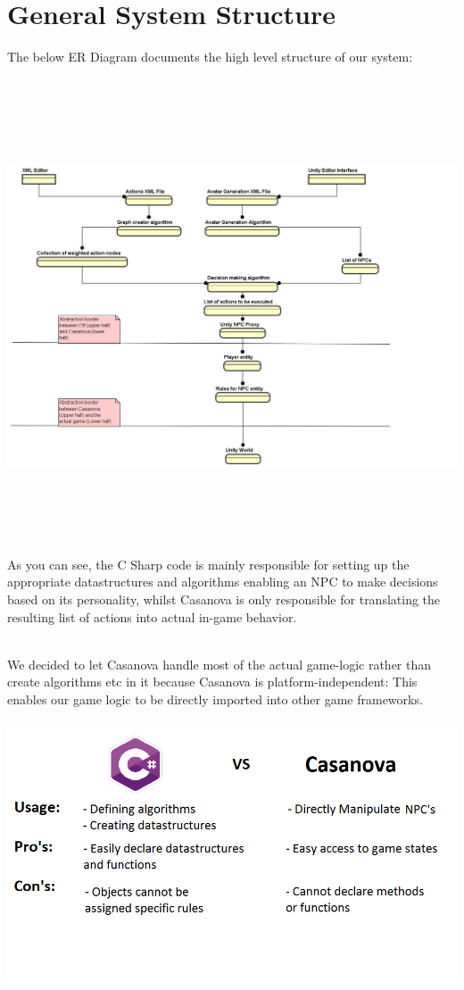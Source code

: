\documentclass[11pt]{article} %
\begin{document}
\newpage
\section{General System Structure}
The below ER Diagram documents the high level structure of our system:

~\\
\includegraphics[width=20cm, height=13cm]{SystemEr}
~\\

\newpage
As you can see, the C Sharp code is mainly responsible for setting up the appropriate datastructures and algorithms enabling an NPC to make decisions based on its personality, whilst Casanova is only responsible for translating the resulting list of actions into actual in-game behavior. 

~\\
We decided to let Casanova handle most of the actual game-logic rather than create algorithms etc in it because Casanova is platform-independent: This enables our game logic to be directly imported into other game frameworks. 

\includegraphics[scale=0.7]{CSHARPVSCASANOVA}
\end{document}
